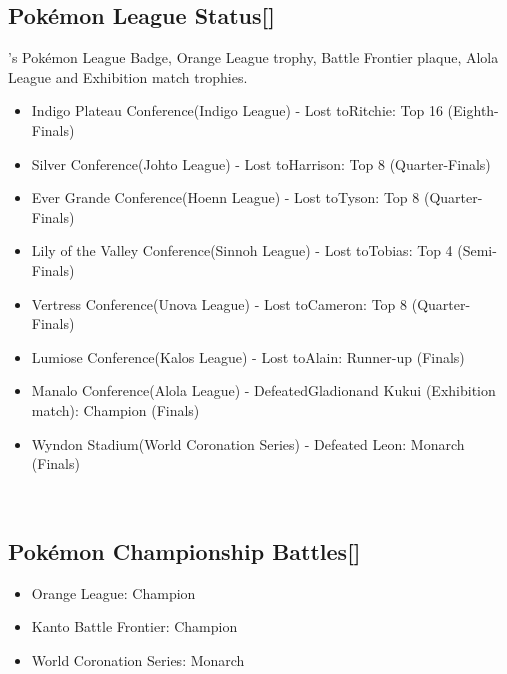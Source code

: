 \documentclass[a4paper,12pt]{article}
\begin{document}
\subsection*{Pokémon League Status[]}\n\nAsh's Pokémon League Badge, Orange League trophy, Battle Frontier plaque, Alola League and Exhibition match trophies.\\ \par \vspace{0.5cm}

\begin{itemize}
\item Indigo Plateau Conference(Indigo League) - Lost toRitchie: Top 16 (Eighth-Finals)
\item Silver Conference(Johto League) - Lost toHarrison: Top 8 (Quarter-Finals)
\item Ever Grande Conference(Hoenn League) - Lost toTyson: Top 8 (Quarter-Finals)
\item Lily of the Valley Conference(Sinnoh League) - Lost toTobias: Top 4 (Semi-Finals)
\item Vertress Conference(Unova League) - Lost toCameron: Top 8 (Quarter-Finals)
\item Lumiose Conference(Kalos League) - Lost toAlain: Runner-up (Finals)
\item Manalo Conference(Alola League) - DefeatedGladionand Kukui (Exhibition match): Champion (Finals)
\item Wyndon Stadium(World Coronation Series) - Defeated Leon: Monarch (Finals)
\end{itemize}\\ \par \vspace{0.5cm}

\subsection*{Pokémon Championship Battles[]}\n\n\begin{itemize}
\item Orange League: Champion
\item Kanto Battle Frontier: Champion
\item World Coronation Series: Monarch
\end{itemize}\\ \par \vspace{0.5cm}
\end{document}
